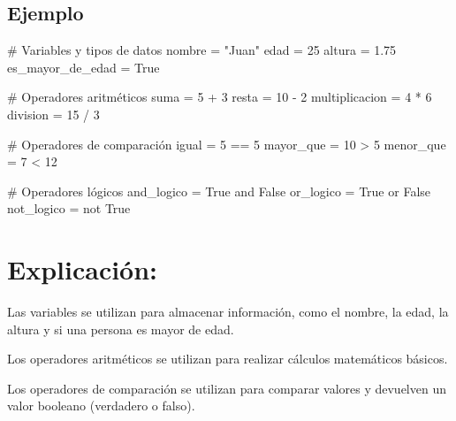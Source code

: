 \documentclass[
  a4paper,
  onepage,
  openany]{scrreprt}
\newenvironment{Shaded}{\begin{snugshade}}{\end{snugshade}}
\newcommand{\CommentTok}[1]{\textcolor[rgb]{0.37,0.37,0.37}{#1}}
\newcommand{\DecValTok}[1]{\textcolor[rgb]{0.68,0.00,0.00}{#1}}
\newcommand{\FloatTok}[1]{\textcolor[rgb]{0.68,0.00,0.00}{#1}}
\newcommand{\KeywordTok}[1]{\textcolor[rgb]{0.00,0.23,0.31}{#1}}
\newcommand{\NormalTok}[1]{\textcolor[rgb]{0.00,0.23,0.31}{#1}}
\newcommand{\OperatorTok}[1]{\textcolor[rgb]{0.37,0.37,0.37}{#1}}
\newcommand{\StringTok}[1]{\textcolor[rgb]{0.13,0.47,0.30}{#1}}
\newcommand{\VariableTok}[1]{\textcolor[rgb]{0.07,0.07,0.07}{#1}}
\begin{document}
\hypertarget{ejemplo-4}{%
\subsection{Ejemplo}\label{ejemplo-4}}

\begin{Shaded}
\begin{Highlighting}[]

\CommentTok{\# Variables y tipos de datos}
\NormalTok{nombre }\OperatorTok{=} \StringTok{"Juan"}
\NormalTok{edad }\OperatorTok{=} \DecValTok{25}
\NormalTok{altura }\OperatorTok{=} \FloatTok{1.75}
\NormalTok{es\_mayor\_de\_edad }\OperatorTok{=} \VariableTok{True}

\CommentTok{\# Operadores aritméticos}
\NormalTok{suma }\OperatorTok{=} \DecValTok{5} \OperatorTok{+} \DecValTok{3}
\NormalTok{resta }\OperatorTok{=} \DecValTok{10} \OperatorTok{{-}} \DecValTok{2}
\NormalTok{multiplicacion }\OperatorTok{=} \DecValTok{4} \OperatorTok{*} \DecValTok{6}
\NormalTok{division }\OperatorTok{=} \DecValTok{15} \OperatorTok{/} \DecValTok{3}

\CommentTok{\# Operadores de comparación}
\NormalTok{igual }\OperatorTok{=} \DecValTok{5} \OperatorTok{==} \DecValTok{5}
\NormalTok{mayor\_que }\OperatorTok{=} \DecValTok{10} \OperatorTok{\textgreater{}} \DecValTok{5}
\NormalTok{menor\_que }\OperatorTok{=} \DecValTok{7} \OperatorTok{\textless{}} \DecValTok{12}

\CommentTok{\# Operadores lógicos}
\NormalTok{and\_logico }\OperatorTok{=} \VariableTok{True} \KeywordTok{and} \VariableTok{False}
\NormalTok{or\_logico }\OperatorTok{=} \VariableTok{True} \KeywordTok{or} \VariableTok{False}
\NormalTok{not\_logico }\OperatorTok{=} \KeywordTok{not} \VariableTok{True}
\end{Highlighting}
\end{Shaded}

\hypertarget{explicaciuxf3n-4}{%
\section{Explicación:}\label{explicaciuxf3n-4}}

Las variables se utilizan para almacenar información, como el nombre, la
edad, la altura y si una persona es mayor de edad.

Los operadores aritméticos se utilizan para realizar cálculos
matemáticos básicos.

Los operadores de comparación se utilizan para comparar valores y
devuelven un valor booleano (verdadero o falso).
\end{document}
